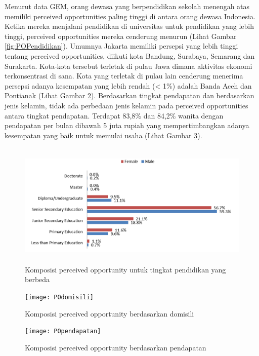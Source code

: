 Menurut data GEM, orang dewasa yang berpendidikan sekolah menengah atas memiliki perceived opportunities paling tinggi di antara orang dewasa Indonesia. Ketika mereka menjalani pendidikan di universitas untuk pendidikan yang lebih tinggi, perceived opportunities mereka cenderung menurun (Lihat Gambar \ref{fig:POPendidikan}). Umumnya Jakarta memiliki persepsi yang lebih tinggi tentang perceived opportunities, diikuti kota Bandung, Surabaya, Semarang dan Surakarta. Kota-kota tersebut terletak di pulau Jawa dimana aktivitas ekonomi terkonsentrasi di sana. Kota yang terletak di pulau lain cenderung menerima persepsi adanya kesempatan yang lebih rendah (< 1\%) adalah Banda Aceh dan Pontianak (Lihat Gambar \ref{fig:POdomisili}). Berdasarkan tingkat pendapatan dan berdasarkan jenis kelamin, tidak ada perbedaan jenis kelamin pada perceived opportunities antara tingkat pendapatan. Terdapat 83,8\% dan 84,2\% wanita dengan pendapatan per bulan dibawah 5 juta rupiah yang mempertimbangkan adanya kesempatan yang baik untuk memulai usaha (Lihat Gambar \ref{fig:POpendapatan}).

\begin{figure} [H]
	\centering  
	\includegraphics[width=14cm, height=6cm]{POPendidikan} 
	\caption[Komposisi perceived opportunity untuk tingkat pendidikan yang berbeda] {Komposisi perceived opportunity untuk tingkat pendidikan yang berbeda} 
	\label{fig:POpendidikan} 
\end{figure}

\begin{figure} [H]
	\centering  
	\texttt{[image: POdomisili]} 
	\caption[Komposisi perceived opportunity berdasarkan domisili]{Komposisi perceived opportunity berdasarkan domisili} 
	\label{fig:POdomisili} 
\end{figure}

\begin{figure} [H]
	\centering  
	\texttt{[image: POpendapatan]} 
	\caption[Komposisi perceived opportunity berdasarkan pendapatan]{Komposisi perceived opportunity berdasarkan pendapatan} 
	\label{fig:POpendapatan} 
\end{figure}

